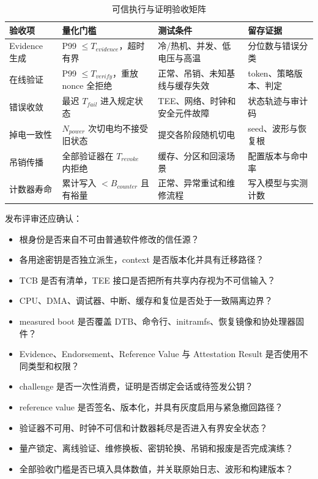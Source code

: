 \begin{table}[H]
  \centering
  \caption{可信执行与证明验收矩阵}
  \begin{tabular}{p{29mm}p{39mm}p{39mm}p{27mm}}
    \hline
    验收项 & 量化门槛 & 测试条件 & 留存证据 \\
    \hline
    Evidence 生成 & P99 $\leq T_{evidence}$，超时有界 & 冷/热机、并发、低电压与高温 & 分位数与错误分类 \\
    在线验证 & P99 $\leq T_{verify}$，重放 nonce 全拒绝 & 正常、吊销、未知基线与缓存失效 & token、策略版本、判定 \\
    错误收敛 & 最迟 $T_{fail}$ 进入规定状态 & TEE、网络、时钟和安全元件故障 & 状态轨迹与审计码 \\
    掉电一致性 & $N_{power}$ 次切电均不接受旧状态 & 提交各阶段随机切电 & seed、波形与恢复根 \\
    吊销传播 & 全部验证器在 $T_{revoke}$ 内拒绝 & 缓存、分区和回滚场景 & 配置版本与命中率 \\
    计数器寿命 & 累计写入 $< B_{counter}$ 且有裕量 & 正常、异常重试和维修流程 & 写入模型与实测计数 \\
    \hline
  \end{tabular}
\end{table}

发布评审还应确认：

\begin{itemize}
  \item 根身份是否来自不可由普通软件修改的信任源？
  \item 各用途密钥是否独立派生，context 是否版本化并具有迁移路径？
  \item TCB 是否有清单，TEE 接口是否把所有共享内存视为不可信输入？
  \item CPU、DMA、调试器、中断、缓存和复位是否处于一致隔离边界？
  \item measured boot 是否覆盖 DTB、命令行、initramfs、恢复镜像和协处理器固件？
  \item Evidence、Endorsement、Reference Value 与 Attestation Result 是否使用不同类型和权限？
  \item challenge 是否一次性消费，证明是否绑定会话或待签发公钥？
  \item reference value 是否签名、版本化，并具有灰度启用与紧急撤回路径？
  \item 验证器不可用、时钟不可信和计数器耗尽是否进入有界安全状态？
  \item 量产锁定、离线验证、维修换板、密钥轮换、吊销和报废是否完成演练？
  \item 全部验收门槛是否已填入具体数值，并关联原始日志、波形和构建版本？
\end{itemize}

